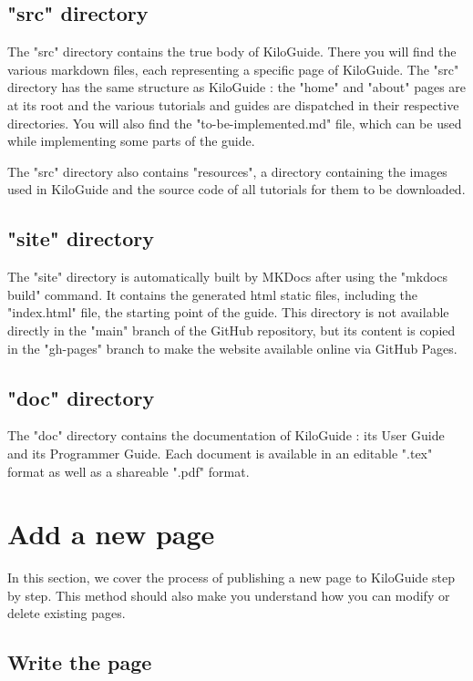 \documentclass[a4paper,12pt,titlepage]{scrartcl}
\begin{document}
\subsection{"src" directory}

The "src" directory contains the true body of KiloGuide. There you will find the various markdown files, each representing a specific page of KiloGuide. The "src" directory has the same structure as KiloGuide : the "home" and "about" pages are at its root and the various tutorials and guides are dispatched in their respective directories. You will also find the "to-be-implemented.md" file, which can be used while implementing some parts of the guide.

The "src" directory also contains "resources", a directory containing the images used in KiloGuide and the source code of all tutorials for them to be downloaded.

\subsection{"site" directory}

The "site" directory is automatically built by MKDocs after using the "mkdocs build" command. It contains the generated html static files, including the "index.html" file, the starting point of the guide. This directory is not available directly in the "main" branch of the GitHub repository, but its content is copied in the "gh-pages" branch to make the website available online via GitHub Pages.

\subsection{"doc" directory}

The "doc" directory contains the documentation of KiloGuide : its User Guide and its Programmer Guide. Each document is available in an editable ".tex" format as well as a shareable ".pdf" format.

\newpage

\section{Add a new page}

In this section, we cover the process of publishing a new page to KiloGuide step by step. This method should also make you understand how you can modify or delete existing pages.

\subsection{Write the page}
\end{document}
